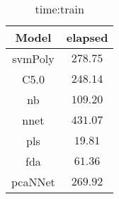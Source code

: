 \begin{table}[!ht]
	\centering
	\begin{tabular}{|c|c|}
		\hline
		Model & elapsed \\ \hline
		svmPoly & $278.75$ \\ \hline
		C5.0 & $248.14$ \\ \hline
		nb & $109.20$ \\ \hline
		nnet & $431.07$ \\ \hline
		pls & $19.81$ \\ \hline
		fda & $61.36$ \\ \hline
		pcaNNet & $269.92$ \\ \hline
	\end{tabular}
	\caption{time:train}
	\label{tab:time:train}
\end{table}
